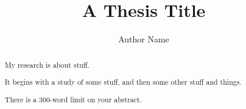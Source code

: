 
\title{A Thesis Title}
\author{Author Name}

\maketitle
\makedeclaration

\begin{abstract} %
My research is about stuff.

It begins with a study of some stuff, and then some other stuff and things.

There is a 300-word limit on your abstract.
\end{abstract}

